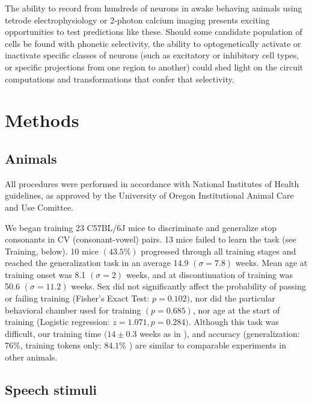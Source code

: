 The ability to record from hundreds of neurons in awake behaving animals using tetrode electrophysiology or 2-photon calcium imaging presents exciting opportunities to test predictions like these. Should some candidate population of cells be found with phonetic selectivity, the ability to optogenetically activate or inactivate specific classes of neurons (such as excitatory or inhibitory cell types, or specific projections from one region to another) could shed light on the circuit computations and transformations that confer that selectivity.

%
%
%
%
\section{\Large Methods}

\subsection{Animals}

All procedures were performed in accordance with National Institutes of Health guidelines, as approved by the University of Oregon Institutional Animal Care and Use Comittee.

We began training 23 C57BL/6J mice to discriminate and generalize stop consonants in CV (consonant-vowel) pairs. 13 mice failed to learn the task (see Training, below). 10 mice $ (43.5\%) $ progressed through all training stages and reached the generalization task in an average 14.9 $(\sigma = 7.8)$ weeks. Mean age at training onset was 8.1 $(\sigma = 2)$ weeks, and at discontinuation of training was 50.6 $(\sigma = 11.2)$ weeks. Sex did not significantly affect the probability of passing or failing training (Fisher's Exact Test: $p = 0.102)$, nor did the particular behavioral chamber used for training $ (p = 0.685) $, nor age at the start of training (Logistic regression: $z = 1.071, p=0.284)$. Although this task was difficult, our training time $(14\pm 0.3$ weeks as in \citep{Engineer2015}), and accuracy (generalization: 76\%\citep{Kluender1987}, training tokens only: $84.1\%$ \citep{Engineer2015}) are similar to comparable experiments in other animals.

\subsection{Speech stimuli}

